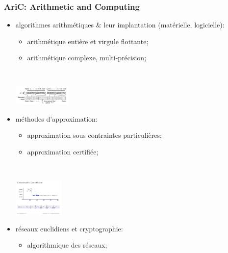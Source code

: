 \documentclass[mathsans]{beamer}
\begin{document}
\begin{frame}
\frametitle{AriC: Arithmetic and Computing}

\begin{itemize}
    \item algorithmes arithmétiques $\&$ leur implantation (matérielle, logicielle): \\
  \begin{minipage}{7cm}  
    \begin{itemize}
         \item arithmétique entière et virgule flottante;
         \item arithmétique complexe, multi-précision;
      \end{itemize} \end{minipage}~~
      \begin{minipage}{3cm}
      \includegraphics[width=2.9cm]{Figures/archisin.pdf}
      \end{minipage}
    \item méthodes d'approximation: \\
    \begin{minipage}{6.9cm}
      \begin{itemize}
            \item approximation sous contraintes particulières; 
            \item approximation certifiée;
       \end{itemize}
         \end{minipage}~~~~
      \begin{minipage}{3cm}
      \includegraphics[width=2.5cm]{Figures/mezzarobba-arith.pdf}
       \end{minipage}
    \item  réseaux euclidiens et cryptographie:\\[-0.2cm]
    \begin{minipage}{6.9cm}
       \begin{itemize}
            \item algorithmique des réseaux;

\end{itemize}
\end{minipage}
\end{itemize}
\end{frame}
\end{document}
